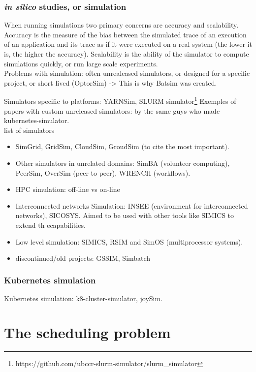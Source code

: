 \documentclass[12pt, a4paper]{memoir}
\begin{document}
\subsubsection{\textit{in silico} studies, or simulation}

When running simulations two primary concerns are accuracy and scalability.
Accuracy is the measure of the bias between the simulated trace of an execution
of an application and its trace as if it were executed on a real system (the
lower it is, the higher the accuracy). Scalability is the ability of the
simulator to compute simulations quickly, or run large scale experiments.\\

Problems with simulation: often unrealeased simulators, or designed for a
specific project, or short lived (OptorSim) -> This is why Batsim was created.

Simulators specific to platforms: YARNSim, SLURM simulator\footnote{https://github.com/ubccr-slurm-simulator/slurm\_simulator} 
Exemples of papers with custom unreleased simulators: \cite{yabuuchi2019lowlatency} by the same guys who made kubernetes-simulator.\\

list of simulators
\begin{itemize}
	\item SimGrid, GridSim, CloudSim, GroudSim (to cite the most important).
	\item Other simulators in unrelated domains: SimBA (volunteer computing), PeerSim, OverSim (peer to peer), WRENCH (workflows).
	\item HPC simulation: off-line vs on-line
	\item Interconnected networks Simulation: INSEE (environment for interconnected networks), SICOSYS. Aimed to be used with other tools like SIMICS to extend th ecapabilities.
	\item Low level simulation: SIMICS, RSIM and SimOS (multiprocessor systems).
	\item discontinued/old projects: GSSIM, Simbatch
\end{itemize}

\subsubsection{Kubernetes simulation}

Kubernetes simulation: k8-cluster-simulator, joySim.


\section{The scheduling problem}
\end{document}
